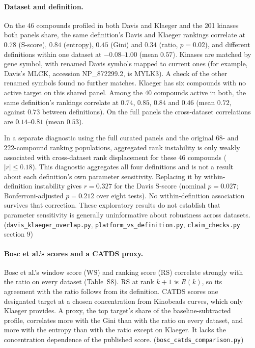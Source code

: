 \documentclass[11pt]{article}
\begin{document}
\paragraph{Dataset and definition.} On the 46 compounds profiled in both Davis
and Klaeger and the 201 kinases both panels share, the same definition's Davis
and Klaeger rankings correlate at $0.78$ (S-score), $0.84$ (entropy), $0.45$
(Gini) and $0.34$ (ratio, $p = 0.02$), and different definitions within one
dataset at $-0.08$--$1.00$ (mean $0.57$). Kinases are matched by gene symbol,
with renamed Davis symbols mapped to current ones (for example, Davis's MLCK,
accession NP\_872299.2, is MYLK3). A check of the other renamed symbols found
no further matches. Klaeger has six compounds with no
active target on this shared panel. Among the 40 compounds active in both, the
same definition's rankings correlate at $0.74$, $0.85$, $0.84$ and $0.46$ (mean
$0.72$, against $0.73$ between definitions). On the full panels the
cross-dataset correlations are $0.14$--$0.81$ (mean $0.53$).

In a separate diagnostic using the full curated panels and the original
68- and 222-compound ranking populations, aggregated rank instability is only
weakly associated with cross-dataset rank displacement for these 46 compounds
($|r| \leq 0.18$). This diagnostic aggregates all four definitions and is not
a result about each definition's own parameter sensitivity. Replacing it by
within-definition instability gives $r = 0.327$ for the Davis S-score
(nominal $p = 0.027$; Bonferroni-adjusted $p = 0.212$ over eight tests).
No within-definition association survives that correction. These exploratory
results do not establish that parameter sensitivity is generally uninformative
about robustness across datasets. (\texttt{davis\_\allowbreak{}klaeger\_\allowbreak{}overlap.py},
\texttt{platform\_\allowbreak{}vs\_\allowbreak{}definition.py}, \texttt{claim\_checks.py} section 9)

\paragraph{Bosc et al.'s scores and a CATDS proxy.} Bosc et al.'s\cite{Bosc2017} window score
(WS) and ranking score (RS) correlate strongly with the ratio on every dataset
(Table~S8). RS at rank $k + 1$ is $R(k)$, so its agreement with the ratio follows
from its definition. CATDS scores one designated target at a chosen
concentration from Kinobeads curves, which only Klaeger provides. A proxy, the
top target's share of the baseline-subtracted profile, correlates more with the
Gini than with the ratio on every dataset, and more with the entropy than with
the ratio except on Klaeger. It lacks the concentration dependence of the
published score. (\texttt{bosc\_catds\_comparison.py})
\end{document}
